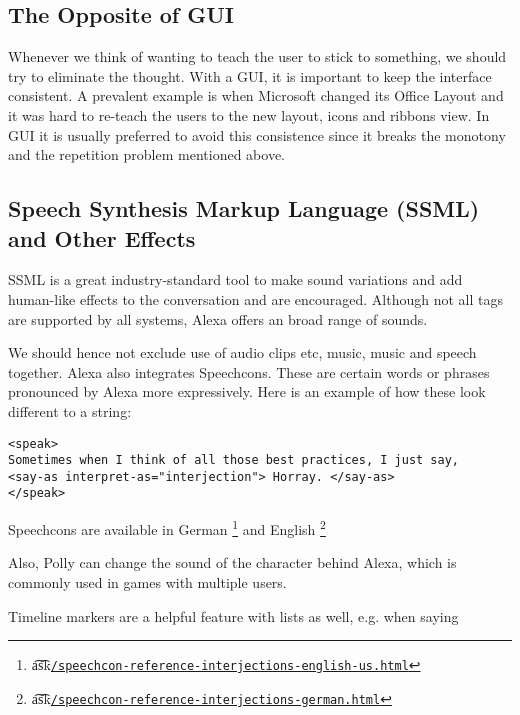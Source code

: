 \subsection*{The Opposite of GUI}
Whenever we think of wanting to teach the user to stick to something, we should try to eliminate the thought. With a GUI, it is important to keep the interface consistent. A prevalent example is when Microsoft changed its Office Layout and it was hard to re-teach the users to the new layout, icons and ribbons view. In GUI it is usually preferred to avoid this consistence since it breaks the monotony and the repetition problem mentioned above.

\subsection*{Speech Synthesis Markup Language (SSML) and Other Effects}
SSML is a great industry-standard tool to make sound variations and add human-like effects to the conversation and are encouraged. Although not all tags are supported by all systems, Alexa offers an broad range of sounds.

We should hence not exclude use of audio clips etc, music, music and speech together. Alexa also integrates Speechcons. These are certain words or phrases pronounced by Alexa more expressively. Here is an example of how these look different to a string:

\begin{verbatim}
<speak>
Sometimes when I think of all those best practices, I just say,
<say-as interpret-as="interjection"> Horray. </say-as> 
</speak>
\end{verbatim}



\noindent Speechcons are available in German \footnote{\t{a\t{sk}}\href{https://developer.amazon.com/docs/custom-skills/speechcon-reference-interjections-english-us.html}{\lstinline|/speechcon-reference-interjections-english-us.html|}} and English \footnote{\t{a\t{sk}}\href{https://developer.amazon.com/docs/custom-skills/speechcon-reference-interjections-german.html}{\lstinline|/speechcon-reference-interjections-german.html|}}

\noindent Also, Polly can change the sound of the character behind Alexa, which is commonly used in games with multiple users.

\noindent Timeline markers are a helpful feature with lists as well, e.g. when saying 

